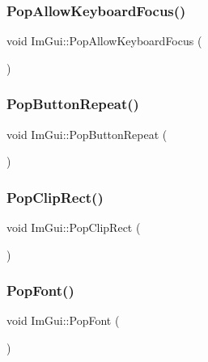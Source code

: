 \hypertarget{namespace_im_gui_a017db69016de97685aec978e504dc96d}{}\label{namespace_im_gui_a017db69016de97685aec978e504dc96d} 
\subsubsection{\texorpdfstring{Pop\+Allow\+Keyboard\+Focus()}{PopAllowKeyboardFocus()}}
{\footnotesize\ttfamily void Im\+Gui\+::\+Pop\+Allow\+Keyboard\+Focus (\begin{DoxyParamCaption}{ }\end{DoxyParamCaption})}

\hypertarget{namespace_im_gui_a0f883e8507be797ca8ba1448d2b9dbb0}{}\label{namespace_im_gui_a0f883e8507be797ca8ba1448d2b9dbb0} 
\subsubsection{\texorpdfstring{Pop\+Button\+Repeat()}{PopButtonRepeat()}}
{\footnotesize\ttfamily void Im\+Gui\+::\+Pop\+Button\+Repeat (\begin{DoxyParamCaption}{ }\end{DoxyParamCaption})}

\hypertarget{namespace_im_gui_aef1c8a6e5a3c70cb10d03d2a2a66dfd8}{}\label{namespace_im_gui_aef1c8a6e5a3c70cb10d03d2a2a66dfd8} 
\subsubsection{\texorpdfstring{Pop\+Clip\+Rect()}{PopClipRect()}}
{\footnotesize\ttfamily void Im\+Gui\+::\+Pop\+Clip\+Rect (\begin{DoxyParamCaption}{ }\end{DoxyParamCaption})}

\hypertarget{namespace_im_gui_af66649bc37022bf3cf2496c73af9a499}{}\label{namespace_im_gui_af66649bc37022bf3cf2496c73af9a499} 
\subsubsection{\texorpdfstring{Pop\+Font()}{PopFont()}}
{\footnotesize\ttfamily void Im\+Gui\+::\+Pop\+Font (\begin{DoxyParamCaption}{ }\end{DoxyParamCaption})}

